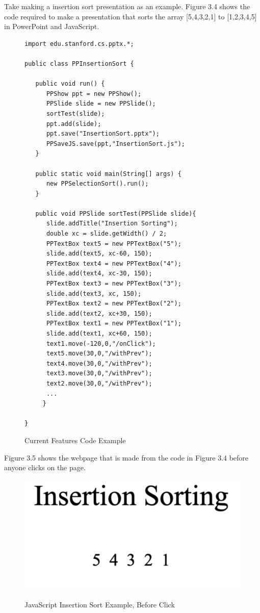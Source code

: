 \documentclass[12pt,twoside]{reedthesis}
\begin{document}
Take making a insertion sort presentation as an example. Figure 3.4 shows the code required to make a presentation that sorts the array [5,4,3,2,1] to [1,2,3,4,5] in PowerPoint and JavaScript.
\begin{figure}[h!tbp]
\caption{Current Features Code Example} 
\begin{lstlisting}[escapechar=!]
import edu.stanford.cs.pptx.*;

public class PPInsertionSort {

   public void run() {
      PPShow ppt = new PPShow();
      PPSlide slide = new PPSlide();
      sortTest(slide);
      ppt.add(slide);
      ppt.save("InsertionSort.pptx");
      PPSaveJS.save(ppt,"InsertionSort.js");
   }

   public static void main(String[] args) {
      new PPSelectionSort().run();
   }
   
   public void PPSlide sortTest(PPSlide slide){
      slide.addTitle("Insertion Sorting");
      double xc = slide.getWidth() / 2;
      PPTextBox text5 = new PPTextBox("5");
      slide.add(text5, xc-60, 150);
      PPTextBox text4 = new PPTextBox("4");
      slide.add(text4, xc-30, 150);
      PPTextBox text3 = new PPTextBox("3");
      slide.add(text3, xc, 150);
      PPTextBox text2 = new PPTextBox("2");
      slide.add(text2, xc+30, 150);
      PPTextBox text1 = new PPTextBox("1");
      slide.add(text1, xc+60, 150);
      text1.move(-120,0,"/onClick");
      text5.move(30,0,"/withPrev");
      text4.move(30,0,"/withPrev");
      text3.move(30,0,"/withPrev");
      text2.move(30,0,"/withPrev");
      ...
     }
	
}
\end{lstlisting}
\end{figure} 
Figure 3.5 shows the webpage that is made from the code in Figure 3.4 before anyone clicks on the page.
\begin{figure}[htbp] 
\begin{centering} 
\caption{JavaScript Insertion Sort Example, Before Click} 
\includegraphics[scale=0.7]{insbefore} 
\label{subd}
\end{centering} 
\end{figure}
\end{document}
